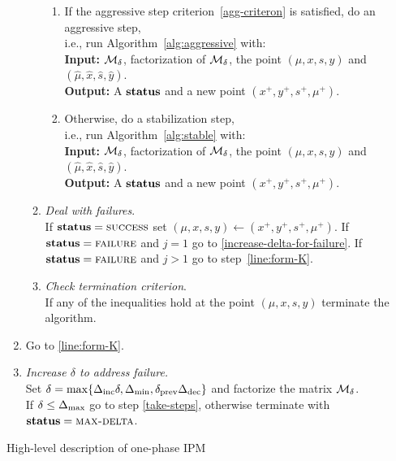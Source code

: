 \documentclass{article}
\begin{document}
\begin{algorithm}[H]
\begin{enumerate}[label*=A.{\arabic*}]
\begin{enumerate}[label*=.{\arabic*}]
\begin{enumerate}[label=-Case {\Roman*}]
\item If the aggressive step criterion~\eqref{agg-criteron} is satisfied, do an aggressive step, \\
i.e., run Algorithm~\ref{alg:aggressive} with: \\
\hspace*{0.1cm}  \textbf{Input:} $\mathcal{M}_{\delta}$, factorization of $\mathcal{M}_{\delta}$, the point $(\mu, x, s, y)$ and $(\hat{\mu}, \hat{x}, \hat{s}, \hat{y})$. \\
\hspace*{0.1cm}  \textbf{Output:} A $\textbf{status}$ and a new point $(x^{+},y^{+},s^{+}, \mu^{+})$.
\item Otherwise, do a stabilization step, \\
i.e., run Algorithm~\ref{alg:stable} with: \\
\hspace*{0.1cm} \textbf{Input:} $\mathcal{M}_{\delta}$, factorization of $\mathcal{M}_{\delta}$, the point $(\mu, x, s, y)$ and $(\hat{\mu}, \hat{x}, \hat{s}, \hat{y})$. \\
\hspace*{0.1cm} \textbf{Output:} A $\textbf{status}$ and a new point $(x^{+},y^{+},s^{+}, \mu^{+})$.
\end{enumerate}
\item \emph{Deal with failures}. \\
If $\textbf{status} = \textsc{success}$ set $(\mu, x, s, y) \gets (x^{+},y^{+},s^{+}, \mu^{+})$. If $\textbf{status} = \textsc{failure}$ and $j = 1$ go to \eqref{increase-delta-for-failure}.  If $\textbf{status} = \textsc{failure}$ and $j > 1$ go to step~\eqref{line:form-K}.
\item \emph{Check termination criterion}. \\
If any of the inequalities \termination{} hold at the point $(\mu,x,s,y)$ terminate the algorithm.
\end{enumerate}
\item 
Go to \eqref{line:form-K}.
\item \label{increase-delta-for-failure} \emph{Increase $\delta$ to address failure.} \\
Set $\delta = \max\{\Delta_{\text{inc}} \delta, \Delta_{\min}, \delta_{\text{prev}} \Delta_{\text{dec}} \}$ and factorize the matrix $\mathcal{M}_{\delta}$. \\
If $\delta \le \Delta_{\max}$ go to step \eqref{take-steps}, otherwise terminate with $\textbf{status} = \textsc{max-delta}$.
\end{enumerate}
\caption{High-level description of one-phase IPM}\label{one-phase-IPM}
\end{algorithm}
\end{document}
